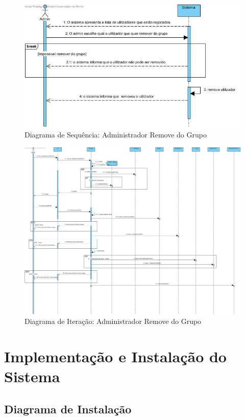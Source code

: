 \begin{figure}[htb!]
	\centering
	\includegraphics[scale=0.5]{imagens/DiagramaSeq/RetirarDoGrupo}  
	\caption{Diagrama de Sequência: Administrador Remove do Grupo}  
\end{figure}

\begin{figure}[htb!]
	\centering
	\includegraphics[scale=0.27]{imagens/DiagramaIt/AdminRemoveDoGrupo}  
	\caption{Diagrama de Iteração: Administrador Remove do Grupo}  
\end{figure}

\newpage
\chapter{Implementação e Instalação do Sistema}

\section{Diagrama de Instalação}

